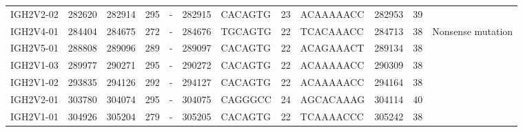 \begin{tabular}{lrrrlrlrlrrl}
  IGH2V2-02 & 282620 & 282914 & 295 & - & 282915 & CACAGTG & 23 & ACAAAAACC & 282953 & 39 &  \\ 
  IGH2V4-01 & 284404 & 284675 & 272 & - & 284676 & TGCAGTG & 22 & TCACAAACC & 284713 & 38 & Nonsense mutation \\ 
  IGH2V5-01 & 288808 & 289096 & 289 & - & 289097 & CACAGTG & 22 & ACAGAAACT & 289134 & 38 &  \\ 
  IGH2V1-03 & 289977 & 290271 & 295 & - & 290272 & CACAGTG & 22 & ACAAAAACC & 290309 & 38 &  \\ 
  IGH2V1-02 & 293835 & 294126 & 292 & - & 294127 & CACAGTG & 22 & ACAAAAACC & 294164 & 38 &  \\ 
  IGH2V2-01 & 303780 & 304074 & 295 & - & 304075 & CAGGGCC & 24 & AGCACAAAG & 304114 & 40 &  \\ 
  IGH2V1-01 & 304926 & 305204 & 279 & - & 305205 & CACAGTG & 22 & TCAAAACCC & 305242 & 38 &  \\ 
   \bottomrule \end{tabular}
